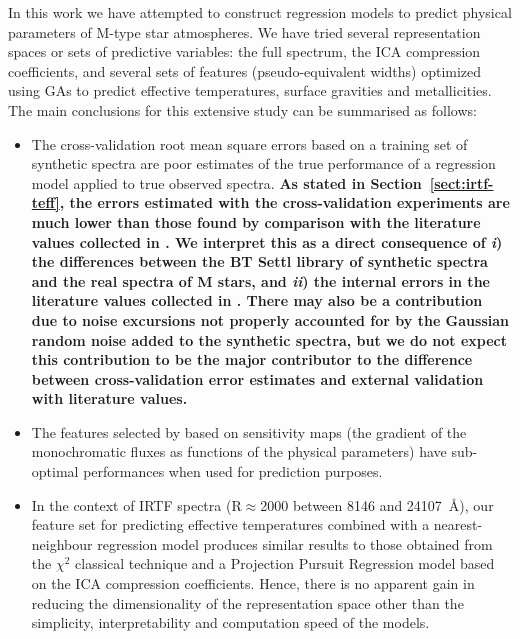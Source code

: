 %
In this work we have attempted to construct regression models to
predict physical parameters of M-type star atmospheres. We have tried
several representation spaces or sets of predictive variables: the
full spectrum, the ICA compression coefficients, and several sets of
features (pseudo-equivalent widths) optimized using GAs to predict
effective temperatures, surface gravities and metallicities. The main
conclusions for this extensive study can be summarised as follows:
\begin{itemize}

\item The cross-validation root mean square errors based on a training
  set of synthetic spectra are poor estimates of the true performance
  of a regression model applied to true observed spectra.
      \textbf{ As stated in Section~\ref{sect:irtf-teff}, the errors
        estimated with the cross-validation experiments are much lower
        than those found by comparison with the literature values
        collected in \cite{cesetti}. We interpret this as a direct
        consequence of {\it i}) the differences between the BT Settl
        library of synthetic spectra and the real spectra of M stars,
        and {\it ii}) the internal errors in the literature values
        collected in \cite{cesetti}. There may also be a contribution
        due to noise excursions not properly accounted for by the
        Gaussian random noise added to the synthetic spectra, but we
        do not expect this contribution to be the major contributor to
        the difference between cross-validation error estimates and
        external validation with literature values.}

\item The features selected by \cite{cesetti} based on sensitivity 
      maps (the gradient of the monochromatic fluxes as functions of the 
      physical parameters) have sub-optimal performances when used 
      for prediction purposes.

\item In the context of IRTF spectra (R$\approx$2000 between 8146 and
  24107\ \AA), our feature set for predicting effective temperatures
  combined with a nearest-neighbour regression model produces similar
  results to those obtained from the $\chi^2$ classical technique and
  a Projection Pursuit Regression model based on the ICA compression
  coefficients. Hence, there is no apparent gain in reducing the
  dimensionality of the representation space other than the
  simplicity, interpretability and computation speed of the models.


\end{itemize}
